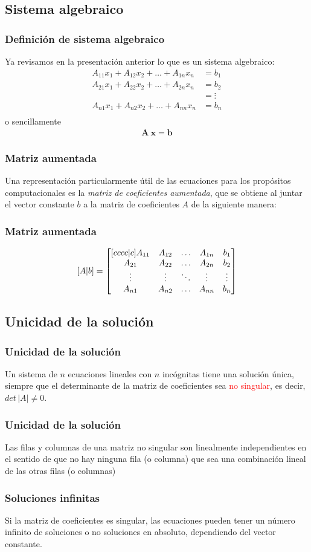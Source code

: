 \subsection{Sistema algebraico}
\begin{frame}
\frametitle{Definición de sistema algebraico}
Ya revisamos en la presentación anterior lo que es un sistema algebraico:
\begin{align*}
A_{11} x_{1} + A_{12} x_{2} + \ldots + A_{1n} x_{n} &= b_{1} \\
A_{21} x_{1} + A_{22} x_{2} + \ldots + A_{2n} x_{n} &= b_{2} \\
 &= \vdots \\
A_{n1} x_{1} + A_{n2} x_{2} + \ldots + A_{nn} x_{n} &= b_{n} \\
\end{align*}
\pause
o sencillamente
\begin{align*}
\mathbf{A \: x} = \mathbf{b}
\end{align*}
\end{frame}
\begin{frame}[fragile]
\frametitle{Matriz aumentada}
Una representación particularmente útil de las ecuaciones para los propósitos computacionales es la \emph{matriz de coeficientes aumentada}, que se obtiene al juntar el vector constante $b$ a la matriz de coeficientes $A$ de la siguiente manera:
\end{frame}
\begin{frame}[fragile]
\frametitle{Matriz aumentada}
\begin{align*}
\qty[ A \vert b ] = 
\begin{bmatrix}[c c c c | c]
A_{11} & A_{12} & \ldots & A_{1n} & b_{1} \\
A_{21} & A_{22} & \ldots & A_{2n} & b_{2} \\
\vdots & \vdots & \ddots & \vdots & \vdots  \\
A_{n1} & A_{n2} & \ldots & A_{nn} & b_{n} 
\end{bmatrix}
\end{align*} 
\end{frame}
\subsection{Unicidad de la solución}
\begin{frame}
\frametitle{Unicidad de la solución}
Un sistema de $n$ ecuaciones lineales con $n$ incógnitas tiene una solución única, siempre que el determinante de la matriz de coeficientes sea \textcolor{red}{no singular}, es decir, $det \, \vert A \vert \neq 0$. 
\end{frame}
\begin{frame}
\frametitle{Unicidad de la solución}
Las filas y columnas de una matriz no singular son linealmente independientes en el sentido de que no hay ninguna fila (o columna) que sea una combinación lineal de las otras filas (o columnas)
\end{frame}
\begin{frame}
\frametitle{Soluciones infinitas}
Si la matriz de coeficientes es singular, las ecuaciones pueden tener un número infinito de soluciones o no soluciones en absoluto, dependiendo del vector constante.
\end{frame}
